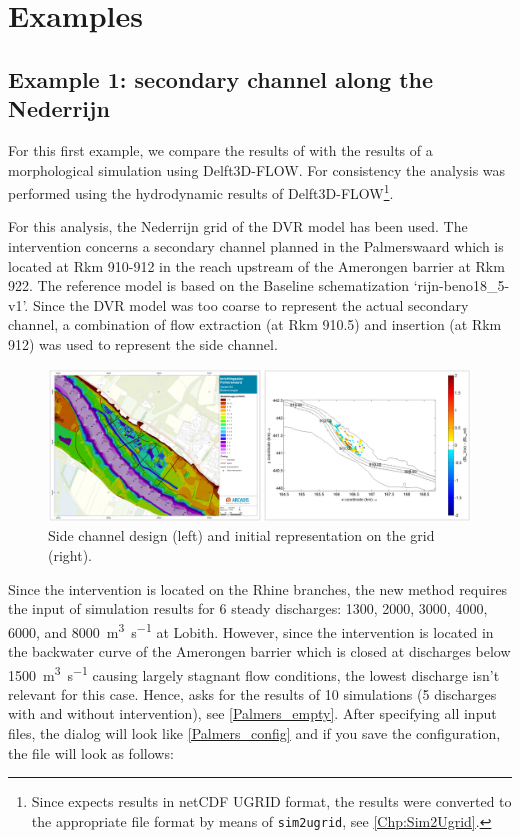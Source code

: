 \chapter{Examples}

\section{Example 1: secondary channel along the Nederrijn}

For this first example, we compare the results of \dfastmi with the results of a morphological simulation using Delft3D-FLOW.
For consistency the \dfastmi analysis was performed using the hydrodynamic results of Delft3D-FLOW\footnote{Since \dfastmi expects \dflowfm results in netCDF UGRID format, the results were converted to the appropriate file format by means of \texttt{sim2ugrid}, see \autoref{Chp:Sim2Ugrid}.}.

For this analysis, the Nederrijn grid of the DVR model has been used.
The intervention concerns a secondary channel planned in the Palmerswaard which is located at Rkm 910-912 in the reach upstream of the Amerongen barrier at Rkm 922.
The reference model is based on the Baseline schematization ‘rijn-beno18\_5-v1’.
Since the DVR model was too coarse to represent the actual secondary channel, a combination of flow extraction (at Rkm 910.5) and insertion (at Rkm 912) was used to represent the side channel.

\begin{figure}
\includegraphics[width=\columnwidth]{figures/Palmerswaard_proj.png}
\caption{Side channel design (left) and initial representation on the grid (right).}
\label{Palmers_proj}
\end{figure}

Since the intervention is located on the Rhine branches, the new \dfastmi method requires the input of simulation results for 6 steady discharges: 1300, 2000, 3000, 4000, 6000, and \SI{8000}{\metre\cubed\per\second} at Lobith.
However, since the intervention is located in the backwater curve of the Amerongen barrier which is closed at discharges below \SI{1500}{\metre\cubed\per\second} causing largely stagnant flow conditions, the lowest discharge isn't relevant for this case.
Hence, \dfmi asks for the results of 10 simulations (5 discharges with and without intervention), see \autoref{Palmers_empty}.
After specifying all input files, the dialog will look like \autoref{Palmers_config} and if you save the configuration, the file will look as follows:

